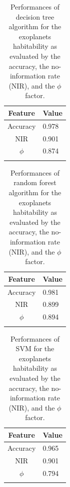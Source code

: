 \documentclass[
12pt, %
a4paper, %
oneside, %
headinclude,footinclude, %
BCOR5mm, %
]{scrartcl}
\begin{document}
\begin{table}[]
\caption{Performances of decision tree algorithm for the exoplanets habitability as evaluated by the accuracy, the no-information rate (NIR), and the $\phi$ factor.}
\begin{center}
\begin{tabular}{l|l}
\multicolumn{1}{c|}{Feature} & Value \\ \hline
\multicolumn{1}{c|}{Accuracy} & 0.978 \\ \hline
\multicolumn{1}{c|}{NIR} & 0.901 \\ \hline
\multicolumn{1}{c|}{$\phi$} & 0.874 \\ 
\label{DecisionTree_perf_tab}
\end{tabular}
\end{center}
\end{table}

\begin{table}[]
\caption{Performances of random forest algorithm for the exoplanets habitability as evaluated by the accuracy, the no-information rate (NIR), and the $\phi$ factor.}
\begin{center}
\begin{tabular}{l|l}
\multicolumn{1}{c|}{Feature} & Value \\ \hline
\multicolumn{1}{c|}{Accuracy} & 0.981 \\ \hline
\multicolumn{1}{c|}{NIR} & 0.899 \\ \hline
\multicolumn{1}{c|}{$\phi$} & 0.894 \\ 
\label{Random Forest_perf_tab}
\end{tabular}
\end{center}
\end{table}

\begin{table}[]
\caption{Performances of SVM for the exoplanets habitability as evaluated by the accuracy, the no-information rate (NIR), and the $\phi$ factor.}
\begin{center}
\begin{tabular}{l|l}
\multicolumn{1}{c|}{Feature} & Value \\ \hline
\multicolumn{1}{c|}{Accuracy} & 0.965 \\ \hline
\multicolumn{1}{c|}{NIR} & 0.901 \\ \hline
\multicolumn{1}{c|}{$\phi$} & 0.794 \\ 
\label{SVM_perf_tab}
\end{tabular}
\end{center}
\end{table}
\end{document}
